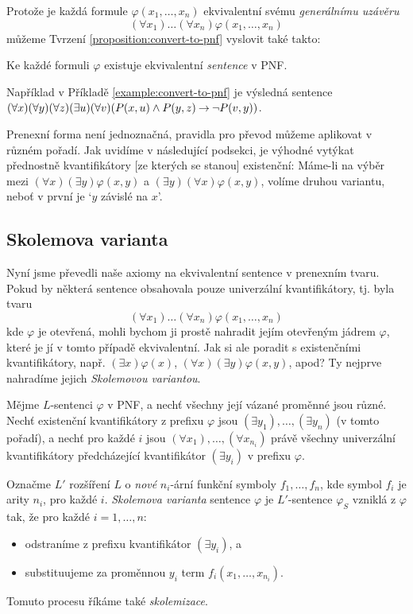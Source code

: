 Protože je každá formule $\varphi(x_1,\dots,x_n)$ ekvivalentní svému \emph{generálnímu uzávěru} $$(\forall x_1)\dots(\forall x_n)\varphi(x_1,\dots,x_n)$$ můžeme Tvrzení \ref{proposition:convert-to-pnf} vyslovit také takto:

\begin{corollary}
    Ke každé formuli $\varphi$ existuje ekvivalentní \emph{sentence} v PNF.
\end{corollary}

Například v Příkladě \ref{example:convert-to-pnf} je výsledná sentence $(\forall x)(\forall y)(\forall z)(\exists u)(\forall v)( P(x,u)\land P(y,z)\mathbin{\rightarrow}\neg P(v,y))$.

\begin{remark}
    Prenexní forma není jednoznačná, pravidla pro převod můžeme aplikovat v různém pořadí. Jak uvidíme v následující podsekci, je výhodné vytýkat přednostně kvantifikátory [ze kterých se stanou] existenční: Máme-li na výběr mezi $(\forall x)(\exists y)\varphi(x,y)$ a $(\exists y)(\forall x)\varphi(x,y)$, volíme druhou variantu, neboť v první je `$y$ závislé na $x$'.
\end{remark}



\subsection{Skolemova varianta}

Nyní jsme převedli naše axiomy na ekvivalentní sentence v prenexním tvaru. Pokud by některá sentence obsahovala pouze univerzální kvantifikátory, tj. byla tvaru
$$(\forall x_1)\dots(\forall x_n)\varphi(x_1,\dots,x_n)$$
kde $\varphi$ je otevřená, mohli bychom ji prostě nahradit jejím otevřeným jádrem $\varphi$, které je jí v tomto případě ekvivalentní. Jak si ale poradit s existenčními kvantifikátory, např. $(\exists x)\varphi(x)$, $(\forall x)(\exists y)\varphi(x,y)$, apod? Ty nejprve nahradíme jejich \emph{Skolemovou variantou}.

\begin{definition}
Mějme $L$-sentenci $\varphi$ v PNF, a nechť všechny její vázané proměnné jsou různé. Nechť existenční kvantifikátory z prefixu $\varphi$ jsou $(\exists y_1),\dots,(\exists y_n)$ (v tomto pořadí), a nechť pro každé $i$ jsou $(\forall x_1),\dots,(\forall x_{n_i})$ právě všechny univerzální kvantifikátory předcházející kvantifikátor $(\exists y_i)$ v prefixu $\varphi$.

Označme $L'$ rozšíření $L$ o \emph{nové} $n_i$-ární funkční symboly $f_1,\dots,f_n$, kde symbol $f_i$ je arity $n_i$, pro každé $i$. \emph{Skolemova varianta} sentence $\varphi$ je $L'$-sentence $\varphi_S$ vzniklá z $\varphi$ tak, že pro každé $i=1,\dots,n$:
\begin{itemize}
    \item odstraníme z prefixu kvantifikátor $(\exists y_i)$, a
    \item substituujeme za proměnnou $y_i$ term $f_i(x_1,\dots,x_{n_i})$.
\end{itemize}
Tomuto procesu říkáme také \emph{skolemizace}.
\end{definition}

